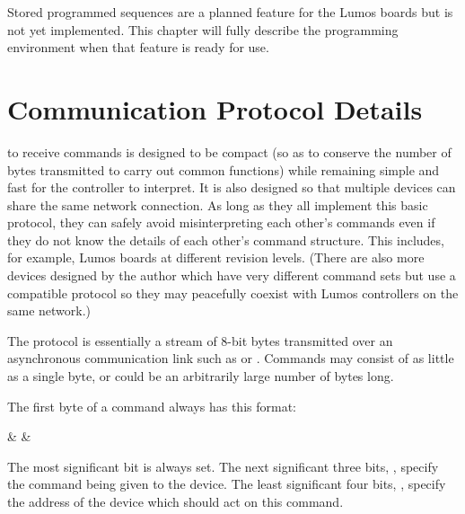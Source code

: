 \documentclass[letterpaper,twoside,onecolumn,openright,final]{memoir}
\begin{document}
\begin{NotImplemented*}{Stored programmed sequences are a planned feature for the Lumos boards but is not
yet implemented.  This chapter will fully describe the programming environment when that feature is
ready for use.}
\end{NotImplemented*}
\chapter{Communication Protocol Details}\label{ch:proto}
 to receive commands is designed to be compact (so as to 
conserve the number of bytes transmitted to carry out common functions) while remaining 
simple and fast for the controller to interpret.  It is also designed so that multiple devices can
share the same  network connection.  As long as they all implement this basic protocol, they can
safely avoid misinterpreting each other's commands even if they do not know the details of each other's
command structure.  This includes, for example, Lumos boards at different revision levels.  (There are
also more devices designed by the author which have very different command sets but use a compatible
protocol so they may peacefully coexist with Lumos controllers on the same network.)

The protocol is essentially a stream of 8-bit bytes transmitted over an asynchronous communication link
such as  or .  Commands may consist of as little as a single byte, or could be an arbitrarily
large number of bytes long.  

The first byte of a command always has this format:  
\begin{BF}
	 &  & 
\end{BF}
The most significant bit is always set.  The next significant three bits, , specify the
command being given to the device.  The least significant four bits, , specify the
address of the device which should act on this command.
\end{document}
